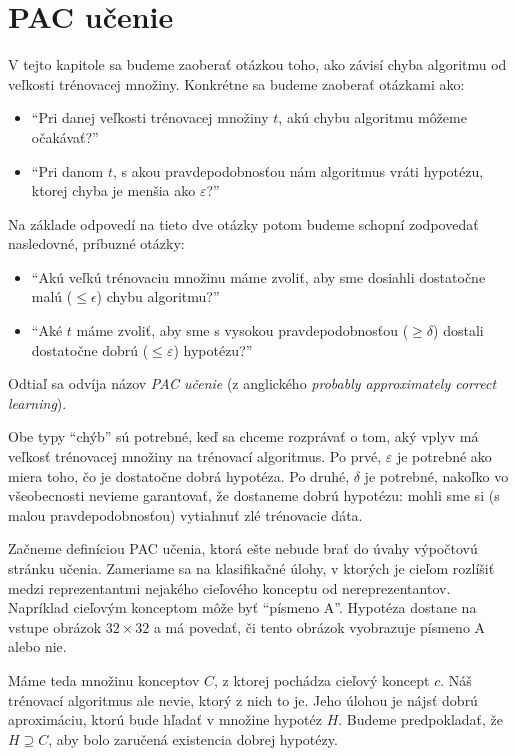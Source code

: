 \chapter{PAC učenie}

V tejto kapitole sa budeme zaoberať otázkou toho, ako závisí chyba
algoritmu od veľkosti trénovacej množiny. Konkrétne sa budeme
zaoberať otázkami ako:
\begin{itemize}
  \item ``Pri danej veľkosti trénovacej množiny $t$, akú chybu algoritmu
    môžeme očakávať?''
  \item ``Pri danom $t$, s akou pravdepodobnosťou nám algoritmus vráti
    hypotézu, ktorej chyba je menšia ako $\varepsilon$?''
\end{itemize}
Na základe odpovedí na tieto dve otázky potom budeme schopní zodpovedať
nasledovné, príbuzné otázky:
\begin{itemize}
  \item ``Akú veľkú trénovaciu množinu máme zvoliť, aby sme dosiahli
    dostatočne malú ($\leq \epsilon$) chybu algoritmu?''
  \item ``Aké $t$ máme zvoliť, aby sme s vysokou pravdepodobnosťou
    ($\geq \delta$) dostali dostatočne dobrú ($\leq \varepsilon$)
    hypotézu?''
\end{itemize}

Odtiaľ sa odvíja názov \emph{PAC učenie} (z anglického
\emph{probably approximately correct learning}).

Obe typy ``chýb'' sú potrebné, keď sa chceme rozprávať o tom,
aký vplyv má veľkosť trénovacej množiny na trénovací algoritmus.
Po prvé, $\varepsilon$ je potrebné ako miera toho, čo je dostatočne
dobrá hypotéza. Po druhé, $\delta$ je potrebné, nakoľko vo všeobecnosti
nevieme garantovať, že dostaneme dobrú hypotézu: mohli sme si
(s malou pravdepodobnosťou) vytiahnuť zlé trénovacie dáta.

Začneme definíciou PAC učenia, ktorá ešte nebude brať do úvahy
výpočtovú stránku učenia.
Zameriame sa na klasifikačné úlohy, v ktorých je cieľom rozlíšiť medzi
reprezentantmi nejakého cieľového konceptu od nereprezentantov. Napríklad
cieľovým konceptom môže byť ``písmeno A''. Hypotéza dostane na vstupe
obrázok $32 \times 32$ a má povedať, či tento obrázok vyobrazuje
písmeno A alebo nie.

Máme teda množinu konceptov $C$, z ktorej pochádza cieľový koncept $c$.
Náš trénovací algoritmus ale nevie, ktorý z nich to je. Jeho úlohou je
nájsť dobrú aproximáciu, ktorú bude hľadať v množine hypotéz $H$. Budeme
predpokladať, že $H \supseteq C$, aby bolo zaručená existencia dobrej
hypotézy.

